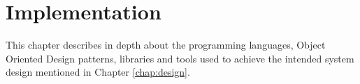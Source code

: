 \newpage
\chapter{Implementation}
This chapter describes in depth about the programming languages, Object Oriented Design patterns, libraries and tools used to achieve the intended system design 
mentioned in Chapter \ref{chap:design}.





